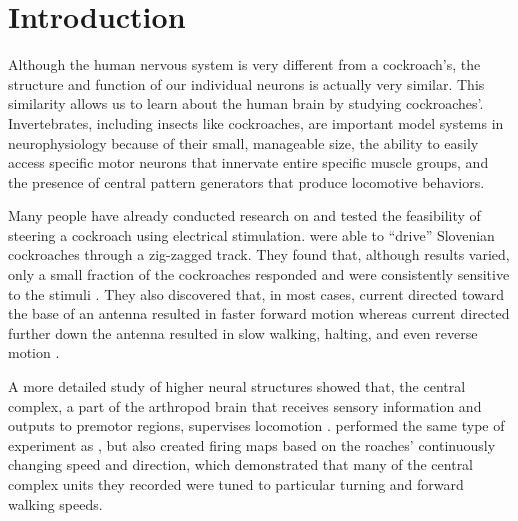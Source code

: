 \section{Introduction}


Although the human nervous system is very different from a cockroach’s, the structure and function of our individual neurons is actually very similar. This similarity allows us to learn about the human brain by studying cockroaches'. Invertebrates, including insects like cockroaches, are important model systems in neurophysiology because of their small, manageable size, the ability to easily access specific motor neurons that innervate entire specific muscle groups, and the presence of central pattern generators that produce locomotive behaviors. 



Many people have already conducted research on and tested the feasibility of steering a cockroach using electrical stimulation. \citet{moore1998directed} were able to ``drive'' Slovenian cockroaches through a zig-zagged track. They found that, although results varied, only a small fraction of the cockroaches responded and were consistently sensitive to the stimuli \citep{moore1998directed}. They also discovered that, in most cases, current directed toward the base of an antenna resulted in faster forward motion whereas current directed further down the antenna resulted in slow walking, halting, and even reverse motion \citep{moore1998directed}.

A more detailed study of higher neural structures showed that, the central complex, a part of the arthropod brain that receives sensory information and outputs to premotor regions, supervises locomotion \citep{guo2013neural}. \citet{guo2013neural} performed the same type of experiment as \citet{moore1998directed}, but also created firing maps based on the roaches' continuously changing speed and direction, which demonstrated that many of the central complex units they recorded were tuned to particular turning and forward walking speeds.

